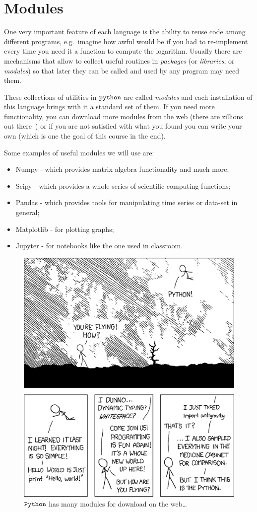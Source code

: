\section{Modules}\label{modules}

One very important feature of each language is the ability to reuse code among different programs, e.g.~imagine how awful would be if you had to re-implement every time you need it a function to compute the logarithm.
Usually there are mechanisms that allow to collect useful routines in \emph{packages} (or \emph{libraries}, or \emph{modules}) so that later they can be called and used by any program may need them.

These collections of utilities in \(\tt{python}\) are called \emph{modules} and each installation of this language brings with it a standard set of them. If you need more functionality, you can download more modules from the web (there are zillions out there~\cite{modules}) or if you are not satisfied with what you found you can write your own (which is one the goal of this course in the end).

Some examples of useful modules we will use are:

\begin{itemize}
\tightlist
\item
  Numpy - which provides matrix algebra functionality and much more;
\item
  Scipy - which provides a whole series of scientific computing
  functions;
\item
  Pandas - which provides tools for manipulating time series or data-set
  in general;
\item
  Matplotlib - for plotting graphs;
\item
  Jupyter - for notebooks like the one used in classroom.
\end{itemize}

\begin{figure}
\centering
\includegraphics[width=0.5\linewidth]{figures/python.png}
\caption{$\tt{Python}$ has many modules for download on the web\ldots{}}
\end{figure}

